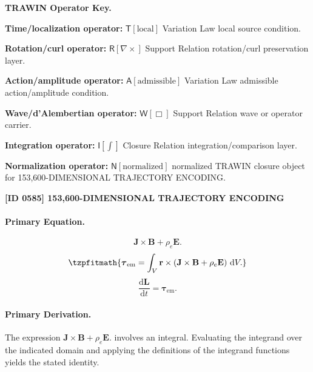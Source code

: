 \par\vspace{0.45\baselineskip}
\noindent\begin{minipage}[t]{\linewidth}
\begingroup
\small
\raggedright
\textbf{TRAWIN Operator Key.}\par
\noindent\textbf{Time/localization operator:} $\mathsf{T}\!\left[\mathrm{local}\right]$ Variation Law local source condition.\par
\noindent\textbf{Rotation/curl operator:} $\mathsf{R}\!\left[\nabla\times\right]$ Support Relation rotation/curl preservation layer.\par
\noindent\textbf{Action/amplitude operator:} $\mathsf{A}\!\left[\mathrm{admissible}\right]$ Variation Law admissible action/amplitude condition.\par
\noindent\textbf{Wave/d'Alembertian operator:} $\mathsf{W}\!\left[\Box\right]$ Support Relation wave or operator carrier.\par
\noindent\textbf{Integration operator:} $\mathsf{I}\!\left[\int\right]$ Closure Relation integration/comparison layer.\par
\noindent\textbf{Normalization operator:} $\mathsf{N}\!\left[\mathrm{normalized}\right]$ normalized TRAWIN closure object for 153,600-DIMENSIONAL TRAJECTORY ENCODING.\par
\endgroup
\end{minipage}

\clearpage
\noindent\textbf{[ID 0585] 153,600-DIMENSIONAL TRAJECTORY ENCODING}\par
\vspace{0.35em}
\paragraph{Primary Equation.}
\[
\mathbf{J}\times\mathbf{B} + \rho_e\mathbf{E}.
\]
\[
\tzpfitmath{\boldsymbol{\tau}_{\mathrm{em}} = \int_V \mathbf{r}\times \left( \mathbf{J}\times\mathbf{B} + \rho_e\mathbf{E} \right) \,\mathrm{d}V.}
\]
\[
\frac{\mathrm{d}\mathbf{L}}{\mathrm{d}t} = \boldsymbol{\tau}_{\mathrm{em}}.
\]

\paragraph{Primary Derivation.}
The expression \( \mathbf{J}\times\mathbf{B} + \rho_e\mathbf{E}. \) involves an integral. Evaluating the integrand over the indicated domain and applying the definitions of the integrand functions yields the stated identity.
